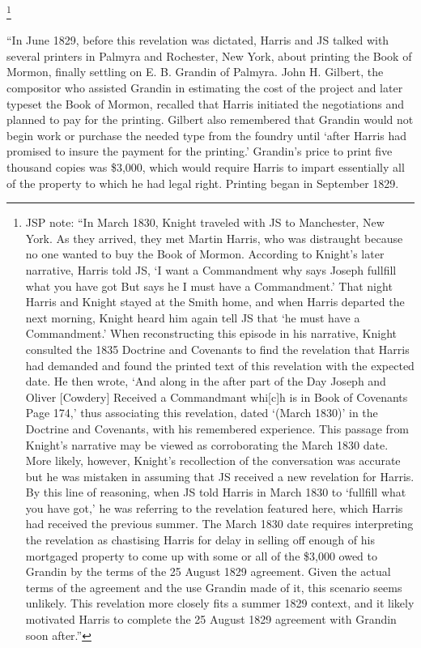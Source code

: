 				\footnote{%
					JSP note: ``In March 1830, Knight traveled with JS to Manchester, New York. As they arrived, they met Martin Harris, who was distraught because no one wanted to buy the Book of Mormon. According to Knight's later narrative, Harris told JS, `I want a Commandment why says Joseph fullfill what you have got But says he I must have a Commandment.' That night Harris and Knight stayed at the Smith home, and when Harris departed the next morning, Knight heard him again tell JS that `he must have a Commandment.' When reconstructing this episode in his narrative, Knight consulted the 1835 Doctrine and Covenants to find the revelation that Harris had demanded and found the printed text of this revelation with the expected date. He then wrote, `And along in the after part of the Day Joseph and Oliver [Cowdery] Received a Commandmant whi[c]h is in Book of Covenants Page 174,' thus associating this revelation, dated `(March 1830)' in the Doctrine and Covenants, with his remembered experience. This passage from Knight's narrative may be viewed as corroborating the March 1830 date. More likely, however, Knight's recollection of the conversation was accurate but he was mistaken in assuming that JS received a new revelation for Harris. By this line of reasoning, when JS told Harris in March 1830 to `fullfill what you have got,' he was referring to the revelation featured here, which Harris had received the previous summer. The March 1830 date requires interpreting the revelation as chastising Harris for delay in selling off enough of his mortgaged property to come up with some or all of the \$3,000 owed to Grandin by the terms of the 25 August 1829 agreement. Given the actual terms of the agreement and the use Grandin made of it, this scenario seems unlikely. This revelation more closely fits a summer 1829 context, and it likely motivated Harris to complete the 25 August 1829 agreement with Grandin soon after.''
					}
			
			``In June 1829, before this revelation was dictated, Harris and JS talked with several printers in Palmyra and Rochester, New York, about printing the Book of Mormon, finally settling on E. B. Grandin of Palmyra. John H. Gilbert, the compositor who assisted Grandin in estimating the cost of the project and later typeset the Book of Mormon, recalled that Harris initiated the negotiations and planned to pay for the printing. Gilbert also remembered that Grandin would not begin work or purchase the needed type from the foundry until `after Harris had promised to insure the payment for the printing.' Grandin's price to print five thousand copies was \$3,000, which would require Harris to impart essentially all of the property to which he had legal right. Printing began in September 1829.
			
